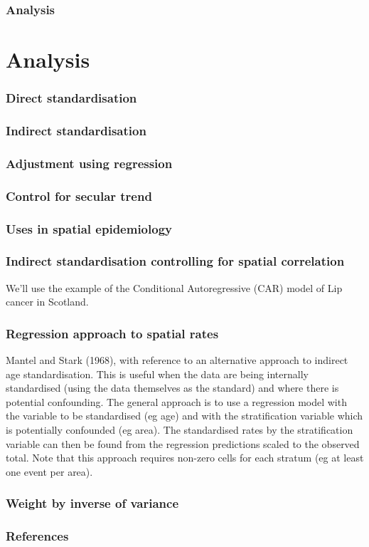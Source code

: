 \documentclass[a4paper]{beamer}
\begin{document}
\begin{frame}
\frametitle{Analysis}
\label{sec-9}

\section{Analysis}
\end{frame}
\begin{frame}
\frametitle{Direct standardisation}
\label{sec-10}
\end{frame}
\begin{frame}
\frametitle{Indirect standardisation}
\label{sec-11}
\end{frame}
\begin{frame}
\frametitle{Adjustment using regression}
\label{sec-12}
\end{frame}
\begin{frame}
\frametitle{Control for secular trend}
\label{sec-13}
\end{frame}
\begin{frame}
\frametitle{Uses in spatial epidemiology}
\label{sec-14}
\end{frame}
\begin{frame}
\frametitle{Indirect standardisation controlling for spatial correlation}
\label{sec-15}

We'll use the example of the Conditional Autoregressive (CAR) model of Lip cancer in Scotland.
\end{frame}
\begin{frame}
\frametitle{Regression approach to spatial rates}
\label{sec-16}

Mantel and Stark (1968), with reference to an alternative approach to indirect age standardisation. This is useful when the data are being internally standardised (using the data themselves as the standard) 
and where there is potential confounding. The general approach is to use a regression model with the variable to be standardised (eg age) and with the stratification variable which is potentially confounded (eg area). 
The standardised rates by the stratification variable can then be found from the regression predictions scaled to the observed total. Note that this approach requires non-zero cells for each stratum (eg at least one event per area).
\end{frame}
\begin{frame}
\frametitle{Weight by inverse of variance}
\label{sec-17}
\end{frame}
\begin{frame}
\frametitle{References}
\label{sec-18}
\end{frame}
\end{document}
